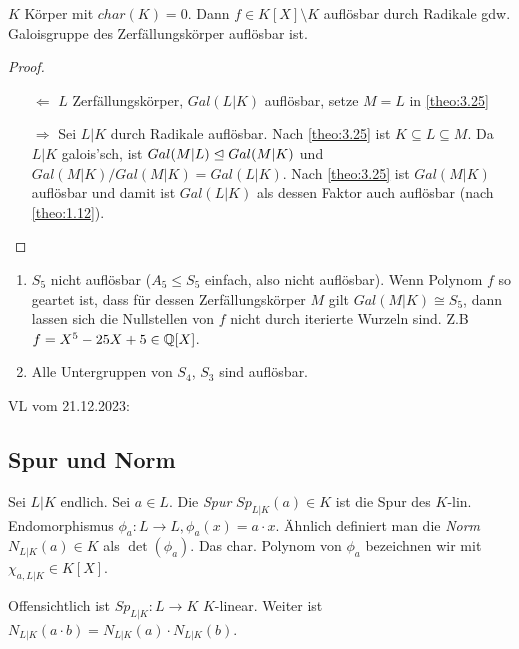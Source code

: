 \documentclass[../main.tex]{subfiles}
\begin{document}
\begin{corollary}
    $K$ Körper mit $char(K)=0$. Dann $f\in K[X]\setminus K$ auflösbar durch Radikale gdw. Galoisgruppe des Zerfällungskörper auflösbar ist.
\end{corollary}
\begin{proof} $ $
    \begin{itemize}
        \item[$\Leftarrow$]
        $L$ Zerfällungskörper, $Gal(L|K)$ auflösbar, setze $M=L$ in \ref{theo:3.25}
        \item[$\Rightarrow$]
        Sei $L|K$ durch Radikale auflösbar.
        Nach \ref{theo:3.25} ist $K\subseteq L \subseteq M$.
        Da $L|K$ galois'sch, ist $Gal(M|L)\trianglelefteq Gal(M|K)$ und $Gal(M|K)/Gal(M|K) = Gal(L|K)$.
        Nach \ref{theo:3.25} ist $Gal(M|K)$ auflösbar und damit ist $Gal(L|K)$ als dessen Faktor auch auflösbar (nach \ref{theo:1.12}).
    \end{itemize}
\end{proof}

\begin{example}
    \begin{enumerate}
        \item $S_5$ nicht auflösbar ($A_5 \leq S_5$ einfach, also nicht auflösbar).
        Wenn Polynom $f$ so geartet ist, dass für dessen Zerfällungskörper $M$  gilt $Gal(M|K) \cong S_5$, dann lassen sich die Nullstellen von $f$ nicht durch iterierte Wurzeln sind.
        Z.B $f=X^5-25X+5\in \mathbb{Q}[X]$.
        \item Alle Untergruppen von $S_4$, $S_3$ sind auflösbar.
    \end{enumerate}
\end{example}

\begin{flushright}
VL vom 21.12.2023:
\end{flushright}
\subsection{Spur und Norm}
\begin{definition}\label{theo:3.28}
    Sei $L|K$ endlich.
    Sei $a\in L$. Die \emph{Spur} $Sp_{L|K}(a)\in K$ ist die Spur des $K$-lin. Endomorphismus $\phi_a:L\rightarrow L, \phi_a(x) = a\cdot x$.
    Ähnlich definiert man die \emph{Norm} $N_{L|K}(a) \in K$ als $\det(\phi_a)$.
    Das char. Polynom von $\phi_a$ bezeichnen wir mit $\chi_{a,L
    |K}\in K[X]$.
\end{definition}
Offensichtlich ist $Sp_{L|K}:L\rightarrow K$ $K$-linear.
Weiter ist $N_{L|K}(a\cdot b) = N_{L|K}(a)\cdot N_{L|K}(b)$.
\end{document}
